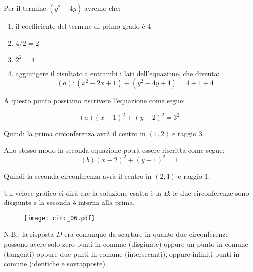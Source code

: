 Per il termine $(y^2-4y)$ avremo che:
\begin{enumerate}
\item il coefficiente del termine di primo grado è $4$
\item $4/2=2$
\item $2^2=4$
\item aggiungere il risultato a entrambi i lati dell'equazione, che diventa:
\begin{equation*}
(a): (x^2-2x+1)+(y^2-4y+4)=4+1+4
\end{equation*}
\end{enumerate}

A questo punto possiamo riscrivere l'equazione come segue:

\begin{equation*}
(a) (x-1)^2+(y-2)^2=3^2
\end{equation*}

Quindi la prima circonferenza avrà il centro in $(1, 2)$ e raggio 3.

Allo stesso modo la seconda equazione potrà essere riscritta come segue:
\begin{equation*}
(b) (x-2)^2+(y-1)^2=1
\end{equation*}

Quindi la seconda circonferenza avrà il centro in $(2, 1)$ e raggio 1.

Un veloce grafico ci dirà che la soluzione esatta è la $B$:
le due circonferenze sono disgiunte e la seconda è interna alla prima.

\begin{figure}[H]
\centering
\texttt{[image: circ\_06.pdf]}
\end{figure}

N.B.: la risposta $D$ era comunque da scartare in quanto due circonferenze
possono avere solo zero punti in comune (disgiunte) oppure un
punto in comune (tangenti) oppure due punti in comune (intersecanti),
oppure infiniti punti in comune (identiche e sovrapposte).



%
%
%
%
%
%
%
%
%
%
%
%
%


